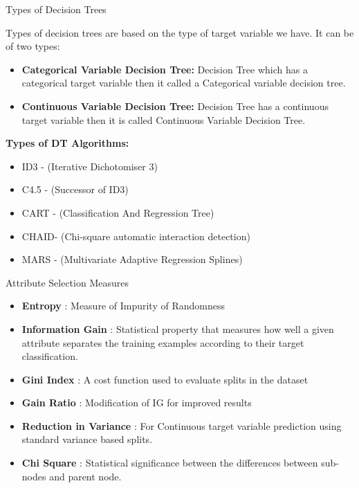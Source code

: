 \documentclass{beamer}
\begin{document}
\begin{frame}{Types of Decision Trees}
	\begin{flushleft}
		Types of decision trees are based on the type of target variable we have. It can be of two types:

\begin{itemize}
	\item \textbf{Categorical Variable Decision Tree:} Decision Tree which has a categorical target variable then it called a Categorical variable decision tree.
	\item \textbf{Continuous Variable Decision Tree:} Decision Tree has a continuous target variable then it is called Continuous Variable Decision Tree.
\end{itemize}
\textbf{Types of DT Algorithms:}
\begin{itemize}
	\item ID3  - (Iterative Dichotomiser 3)
	\item C4.5 - (Successor of ID3)
	\item CART - (Classification And Regression Tree)
	\item CHAID- (Chi-square automatic interaction detection)
	\item MARS - (Multivariate Adaptive Regression Splines)
\end{itemize}
\end{flushleft}
\end{frame}

\begin{frame}{Attribute Selection Measures}
\begin{flushleft}
		\begin{itemize}
	\item \textbf{Entropy} : Measure of Impurity of Randomness
	\item \textbf{Information Gain} : Statistical property that measures how well a given attribute separates the training examples according to their target classification. 
	\item \textbf{Gini Index} : A cost function used to evaluate splits in the dataset
	\item \textbf{Gain Ratio} : Modification of IG for improved results
	\item \textbf{Reduction in Variance} : For Continuous target variable prediction using standard variance based splits.
	\item \textbf{Chi Square} : Statistical significance between the differences between sub-nodes and parent node. 
\end{itemize}
	\end{flushleft}
\end{frame}
\end{document}
